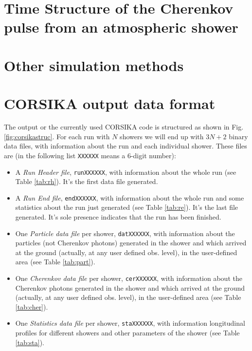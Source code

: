 \documentclass[12pt]{article}
\def\CORSIKA{\textsf{CORSIKA}\xspace}
\def\cerenkov{Cherenkov\xspace}             %
\def\Cherenkov{\cerenkov}                   %
\begin{document}
\section{Time Structure of the \Cherenkov pulse from an atmospheric shower}

\section{Other simulation methods}
\label{sec:simothers}

\section{\CORSIKA output data format}

The output or the currently used \CORSIKA code is structured as shown
in Fig. \ref{fig:corsikastruc}. For each run with $N$ showers we will
end up with $3 N+2$ binary data files, with information about the
run and each individual shower. These files are (in the following list
\texttt{XXXXXX} means a 6-digit number):

\CORSIKAstructfig

\begin{itemize}
  
\item A \emph{Run Header file}, \texttt{runXXXXXX}, with information
  about the whole run (see Table \ref{tab:rh}). It's the first data
  file generated.
  
\item A \emph{Run End file}, \texttt{endXXXXXX}, with information
  about the whole run and some statistics about the run just generated
  (see Table \ref{tab:re}). It's the last file generated. It's sole
  presence indicates that the run has been finished.
  
\item One \emph{Particle data file} per shower, \texttt{datXXXXXX},
  with information about the particles (not Cherenkov photons)
  generated in the shower and which arrived at the ground (actually,
  at any user defined obs. level), in the user-defined area (see Table
  \ref{tab:part}).
  
\item One \emph{Cherenkov data file} per shower, \texttt{cerXXXXXX},
  with information about the Cherenkov photons generated in the shower
  and which arrived at the ground (actually, at any user defined obs.
  level), in the user-defined area (see Table \ref{tab:cher}).
  
\item One \emph{Statistics data file} per shower, \texttt{staXXXXXX},
  with information longitudinal profiles for different showers and
  other parameters of the shower (see Table \ref{tab:sta}).

\end{itemize}
\end{document}
